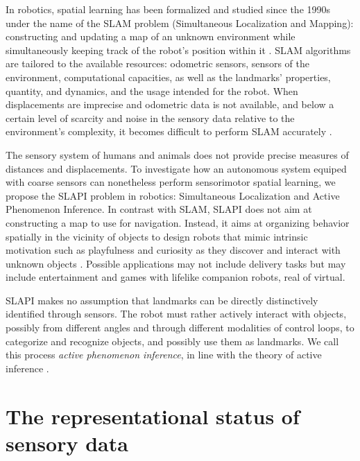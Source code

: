 \documentclass[pmlr]{jmlr}%
\begin{document}
In robotics, spatial learning has been formalized and studied since the 1990s under the name of the SLAM problem (Simultaneous Localization and Mapping): constructing and updating a map of an unknown environment while simultaneously keeping track of the robot's position within it \citep[e.g.,][]{taketomi_visual_2017}.
SLAM algorithms are tailored to the available resources: odometric sensors, sensors of the environment, computational capacities, as well as the landmarks' properties, quantity, and dynamics, and the usage intended for the robot.
When displacements are imprecise and odometric data is not available, and below a certain level of scarcity and noise in the sensory data relative to the environment’s complexity, it becomes difficult to perform SLAM accurately \citep{gay_towards_2021}. 

The sensory system of humans and animals does not provide precise measures of distances and displacements. 
To investigate how an autonomous system equiped with coarse sensors can nonetheless perform sensorimotor spatial learning, we propose the SLAPI problem in robotics: Simultaneous Localization and Active Phenomenon Inference.
In contrast with SLAM, SLAPI does not aim at constructing a map to use for navigation. 
Instead, it aims at organizing behavior spatially in the vicinity of objects to design robots that mimic intrinsic motivation such as playfulness and curiosity as they discover and interact with unknown objects \citep[e.g.,][]{oudeyer_intrinsic_2007}. 
Possible applications may not include delivery tasks but may include entertainment and games with lifelike companion robots, real of virtual. 

SLAPI makes no assumption that landmarks can be directly distinctively identified through sensors. 
The robot must rather actively interact with objects, possibly from different angles and through different modalities of control loops, to categorize and recognize objects, and possibly use them as landmarks. 
We call this process \textit{active phenomenon inference}, in line with the theory of active inference \cite[e.g.,][]{friston_world_2021}. 


\section{The representational status of sensory data}
\label{sec:input}
\end{document}
